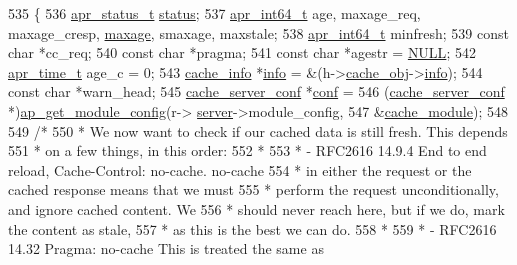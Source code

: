 \begin{DoxyCode}
535 \{
536     \hyperlink{group__apr__errno_gaa5105fa83cc322f09382292db8b47593}{apr\_status\_t} \hyperlink{group__APACHE__CORE__HTTPD_ga6e27f49150e9a14580fb313cc2777e00}{status};
537     \hyperlink{group__apr__platform_ga4b75afbf973dc6c8aea4ae75b044aa08}{apr\_int64\_t} age, maxage\_req, maxage\_cresp, \hyperlink{group__APACHE__CORE__COOKIE_ga846f24530366d967942121cbfdca1ea7}{maxage}, smaxage, maxstale;
538     \hyperlink{group__apr__platform_ga4b75afbf973dc6c8aea4ae75b044aa08}{apr\_int64\_t} minfresh;
539     \textcolor{keyword}{const} \textcolor{keywordtype}{char} *cc\_req;
540     \textcolor{keyword}{const} \textcolor{keywordtype}{char} *pragma;
541     \textcolor{keyword}{const} \textcolor{keywordtype}{char} *agestr = \hyperlink{pcre_8txt_ad7f989d16aa8ca809a36bc392c07fba1}{NULL};
542     \hyperlink{group__apr__time_gadb4bde16055748190eae190c55aa02bb}{apr\_time\_t} age\_c = 0;
543     \hyperlink{structcache__info}{cache\_info} *\hyperlink{group__AP__EXPR_gae5e165b68fbb12afc88707b8e6eb2f08}{info} = &(h->\hyperlink{structcache__handle_aea71e9fd166a32e0fe46a12668a1f3bd}{cache\_obj}->\hyperlink{structcache__object_ab4b2aae3e314dfa7abe8304c33cedb83}{info});
544     \textcolor{keyword}{const} \textcolor{keywordtype}{char} *warn\_head;
545     \hyperlink{structcache__server__conf}{cache\_server\_conf} *\hyperlink{group__APACHE__CORE__HTTPD_ga7be6dfd9155648f64d6e9abcd78c38cd}{conf} =
546       (\hyperlink{structcache__server__conf}{cache\_server\_conf} *)\hyperlink{group__APACHE__CORE__CONFIG_ga1093a5908a384eacc929b028c79f2a02}{ap\_get\_module\_config}(r->
      \hyperlink{structrequest__rec_a4a8059930ce9409cb885fdeef6921b7b}{server}->module\_config,
547                                                 &\hyperlink{mod__cache_8c_a315b551bc967794e90417b5538a128f1}{cache\_module});
548 
549     \textcolor{comment}{/*}
550 \textcolor{comment}{     * We now want to check if our cached data is still fresh. This depends}
551 \textcolor{comment}{     * on a few things, in this order:}
552 \textcolor{comment}{     *}
553 \textcolor{comment}{     * - RFC2616 14.9.4 End to end reload, Cache-Control: no-cache. no-cache}
554 \textcolor{comment}{     * in either the request or the cached response means that we must}
555 \textcolor{comment}{     * perform the request unconditionally, and ignore cached content. We}
556 \textcolor{comment}{     * should never reach here, but if we do, mark the content as stale,}
557 \textcolor{comment}{     * as this is the best we can do.}
558 \textcolor{comment}{     *}
559 \textcolor{comment}{     * - RFC2616 14.32 Pragma: no-cache This is treated the same as}

\end{DoxyCode}
